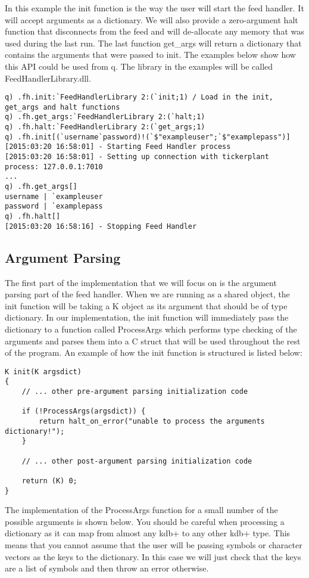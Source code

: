 In this example the init function is the way the user will start the feed handler. It will accept
arguments as a dictionary. We will also provide a zero-argument halt function that disconnects from
the feed and will de-allocate any memory that was used during the last run. The last function get\_args
will return a dictionary that contains the arguments that were passed to init. The examples below show
how this API could be used from q. The library in the examples will be called FeedHandlerLibrary.dll.

\begin{lstlisting}
q) .fh.init:`FeedHandlerLibrary 2:(`init;1) / Load in the init, get_args and halt functions
q) .fh.get_args:`FeedHandlerLibrary 2:(`halt;1)
q) .fh.halt:`FeedHandlerLibrary 2:(`get_args;1)
q) .fh.init[(`username`password)!(`$"exampleuser";`$"examplepass")]
[2015:03:20 16:58:01] - Starting Feed Handler process
[2015:03:20 16:58:01] - Setting up connection with tickerplant process: 127.0.0.1:7010
...
q) .fh.get_args[]
username | `exampleuser
password | `examplepass
q) .fh.halt[]
[2015:03:20 16:58:16] - Stopping Feed Handler 
\end{lstlisting}

\subsection{Argument Parsing}

The first part of the implementation that we will focus on is the argument parsing part of the
feed handler. When we are running as a shared object, the init function will be taking a K object
as its argument that should be of type dictionary. In our implementation, the init function will
immediately pass the dictionary to a function called ProcessArgs which performs type checking of
the arguments and parses them into a C struct that will be used throughout the rest of the program.
An example of how the init function is structured is listed below:

\begin{lstlisting}
K init(K argsdict)
{
	// ... other pre-argument parsing initialization code
	
	if (!ProcessArgs(argsdict)) {
		return halt_on_error("unable to process the arguments dictionary!");
	}
	
	// ... other post-argument parsing initialization code
	
	return (K) 0;
}
\end{lstlisting}

The implementation of the ProcessArgs function for a small number of the possible arguments is shown
below. You should be careful when processing a dictionary as it can map from almost any kdb+ to any
other kdb+ type. This means that you cannot assume that the user will be passing symbols or character
vectors as the keys to the dictionary. In this case we will just check that the keys are a list of
symbols and then throw an error otherwise.

